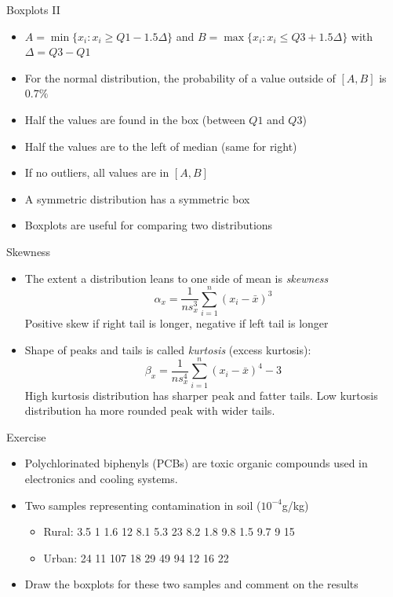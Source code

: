\documentclass{beamer}
\begin{document}
\begin{frame}{Boxplots II} 
\begin{itemize} 
 \item $A = \min \{x_i : x_i \geq Q1 - 1.5\Delta \}$ and $B = \max\{x_i : x_i \leq Q3 + 1.5\Delta \}$ with $\Delta = Q3 - Q1$
 \item For the normal distribution, the probability of a value outside of $[A, B]$ is $0.7\%$
 \item Half the values are found in the box (between $Q1$ and $Q3$) 
 \item Half the values are to the left of median (same for right)
 \item If no outliers, all values are in $[A, B]$
 \item A symmetric distribution has a symmetric box
 \item Boxplots are useful for comparing two distributions 
\end{itemize}
\end{frame}

\begin{frame}{Skewness}  
\begin{itemize} 
 \item The extent a distribution leans to one side of mean is \emph{skewness} 
\begin{displaymath} 
 \alpha_x = \frac{1}{ns^3_x} \sum_{i=1}^n (x_i - \bar{x})^3
\end{displaymath}
Positive skew if right tail is longer, negative if left tail is longer 
\item Shape of peaks and tails is called \emph{kurtosis} (excess kurtosis):
\begin{displaymath} 
 \beta_x = \frac{1}{ns^4_x} \sum_{i=1}^n (x_i - \bar{x})^4 - 3
\end{displaymath}
High kurtosis distribution has sharper peak and fatter tails. Low kurtosis distribution ha more rounded peak with wider tails. 
\end{itemize}
 
\end{frame}


\begin{frame}{Exercise}  
\begin{itemize} 
 \item Polychlorinated biphenyls (PCBs) are toxic organic compounds used in electronics and cooling systems. 
 \item Two samples representing contamination in soil ($10^{-4}$g/kg)
 \begin{itemize}
 \item Rural: 3.5 1 1.6 12 8.1 5.3 23 8.2 1.8 9.8 1.5 9.7 9 15
 \item Urban: 24 11 107 18 29 49 94 12 16 22 
 \end{itemize}
 \item Draw the boxplots for these two samples and comment on the results
\end{itemize}
\end{frame}
\end{document}
